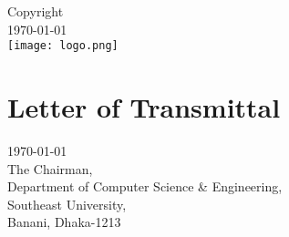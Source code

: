 \documentclass[12pt]{report} %
\begin{document}
\begin{titlepage}


\ifx
\textregistered\textcopyright
\sffamily\textregistered\textcopyright
\fi

Copyright\\
\today\\[1cm]

\texttt{[image: logo.png]}\\[1cm] %
 

\vfill %

\end{titlepage}





\section*{Letter of Transmittal}
\thispagestyle{empty}
\today\\
The Chairman,\\
Department of Computer Science \& Engineering,\\
Southeast University,\\
Banani, Dhaka-1213\\
\end{document}
